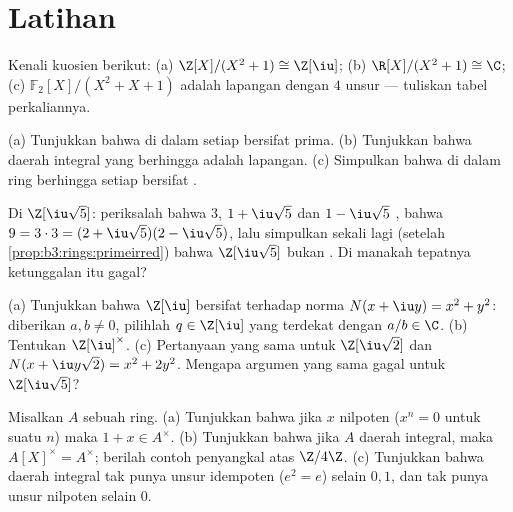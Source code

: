 \section{Latihan}

\begin{exercise}[$\star$]\label{exo:b3:rings:1}
Kenali kuosien berikut: (a) $\Z[X]/(X^2 + 1) \cong \Z[\iu]$;
(b) $\R[X]/(X^2+1) \cong \C$; (c) $\mathbb F_2[X]/(X^2 + X + 1)$
adalah lapangan dengan $4$ unsur --- tuliskan tabel perkaliannya.
\end{exercise}

\begin{exercise}[$\star$]\label{exo:b3:rings:2}
(a) Tunjukkan bahwa di dalam  setiap  bersifat prima.
(b) Tunjukkan bahwa daerah integral yang berhingga adalah lapangan.
(c) Simpulkan bahwa di dalam ring berhingga setiap  bersifat .
\end{exercise}

\begin{exercise}[$\star$]\label{exo:b3:rings:3}
Di $\Z[\iu\sqrt5]$: periksalah bahwa $3$, $1 + \iu\sqrt5$ dan $1 -
\iu\sqrt5$ , bahwa $9 = 3\cdot 3 = (2 +
\iu\sqrt5)(2 - \iu\sqrt5)$, lalu simpulkan sekali lagi (setelah
\cref{prop:b3:rings:primeirred}) bahwa $\Z[\iu\sqrt5]$ bukan
. Di manakah tepatnya ketunggalan itu gagal?
\end{exercise}

\begin{exercise}[$\star\star$]\label{exo:b3:rings:4}
(a) Tunjukkan bahwa $\Z[\iu]$ bersifat  terhadap norma $N(x + \iu y) =
x^2 + y^2$: diberikan $a, b \neq 0$, pilihlah $q \in \Z[\iu]$ yang terdekat
dengan $a/b \in \C$.
(b) Tentukan $\Z[\iu]^\times$.
(c) Pertanyaan yang sama untuk $\Z[\iu\sqrt2]$ dan $N(x + \iu y\sqrt2) =
x^2 + 2y^2$. Mengapa argumen yang sama gagal untuk
$\Z[\iu\sqrt5]$?
\end{exercise}

\begin{exercise}[$\star\star$]\label{exo:b3:rings:5}
Misalkan $A$ sebuah ring. (a) Tunjukkan bahwa jika $x$ nilpoten ($x^n = 0$
untuk suatu $n$) maka $1 + x \in A^\times$. (b) Tunjukkan bahwa jika $A$
daerah integral, maka $A[X]^\times = A^\times$; berilah contoh penyangkal atas
$\Z/4\Z$. (c) Tunjukkan bahwa daerah integral tak punya unsur idempoten ($e^2 = e$)
selain $0, 1$, dan tak punya unsur nilpoten selain $0$.
\end{exercise}

